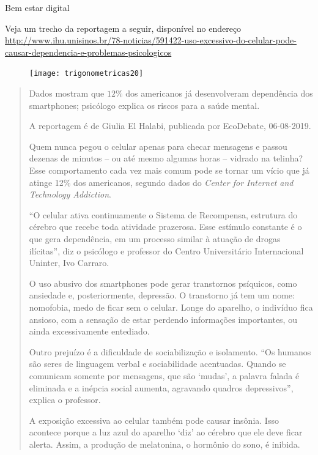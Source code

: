 \begin{task}{Bem estar digital}
\label{trig-ativ6}


Veja um trecho da reportagem a seguir, disponível no endereço \url{http://www.ihu.unisinos.br/78-noticias/591422-uso-excessivo-do-celular-pode-causar-dependencia-e-problemas-psicologicos}


\begin{figure}[H]
\centering

\texttt{[image: trigonometricas20]}

\end{figure}

\begin{quote}

Dados mostram que $12\%$ dos americanos já desenvolveram dependência dos smartphones; psicólogo explica os riscos para a saúde mental.

A reportagem é de Giulia El Halabi, publicada por EcoDebate, 06-08-2019.


Quem nunca pegou o celular apenas para checar mensagens e passou dezenas de minutos – ou até mesmo algumas horas – vidrado na telinha? Esse comportamento cada vez mais comum pode se tornar um vício que já atinge 12\% dos americanos, segundo dados do \textit{Center for Internet and Technology Addiction}.

“O celular ativa continuamente o Sistema de Recompensa, estrutura do cérebro que recebe toda atividade prazerosa. Esse estímulo constante é o que gera dependência, em um processo similar à atuação de drogas ilícitas”, diz o psicólogo e professor do Centro Universitário Internacional Uninter, Ivo Carraro.

O uso abusivo dos smartphones pode gerar transtornos psíquicos, como ansiedade e, posteriormente, depressão. O transtorno já tem um nome: nomofobia, medo de ficar sem o celular. Longe do aparelho, o indivíduo fica ansioso, com a sensação de estar perdendo informações importantes, ou ainda excessivamente entediado.

Outro prejuízo é a dificuldade de sociabilização e isolamento. “Os humanos são seres de linguagem verbal e sociabilidade acentuadas. Quando se comunicam somente por mensagens, que são ‘mudas’, a palavra falada é eliminada e a inépcia social aumenta, agravando quadros depressivos”, explica o professor.

A exposição excessiva ao celular também pode causar insônia. Isso acontece porque a luz azul do aparelho ‘diz’ ao cérebro que ele deve ficar alerta. Assim, a produção de melatonina, o hormônio do sono, é inibida.


\end{quote}
\end{task}
